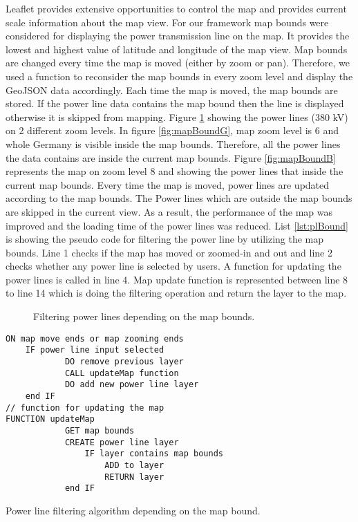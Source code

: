 Leaflet provides extensive opportunities to control the map and provides current scale information about the map view. For our framework map bounds were considered for displaying the power transmission line on the map. It provides the lowest and highest value of latitude and longitude of the map view. Map bounds are changed every time the map is moved (either by zoom or pan).  Therefore, we used a function to reconsider the map bounds in every zoom level and display the GeoJSON data accordingly. Each time the map is moved, the map bounds are stored. If the power line data contains the map bound then the line is displayed otherwise it is skipped from mapping. Figure \ref{fig:mpbound} showing the power lines (380 kV) on 2 different zoom levels. In figure \ref{fig:mapBoundG}, map zoom level is 6 and whole Germany is visible inside the map bounds. Therefore, all the power lines the data contains are inside the current map bounds. Figure \ref{fig:mapBoundB} represents the map on zoom level 8 and showing the power lines that inside the current map bounds. Every time the map is moved, power lines are updated according to the map bounds. The Power lines which are outside the map bounds are skipped in the current view. As a result, the performance of the map was improved and the loading time of the power lines was reduced. List \ref{lst:plBound} is showing the pseudo code for filtering the power line by utilizing the map bounds. Line 1 checks if the map has moved or zoomed-in and out and line 2 checks whether any power line is selected by users. A function for updating the power lines is called in line 4. Map update function is represented between line 8 to line 14 which is doing the filtering operation and return the layer to the map. 

\begin{figure}
  \begin{center}
\hfill
{}
\hfill
\caption{Filtering power lines depending on the map bounds.}
\label{fig:mpbound}
\end{center}
\end{figure}

\begin{Listing}
\begin{lstlisting}
ON map move ends or map zooming ends
	IF power line input selected
			DO remove previous layer
			CALL updateMap function
			DO add new power line layer
	end IF
// function for updating the map
FUNCTION updateMap
			GET map bounds
			CREATE power line layer
				IF layer contains map bounds
					ADD to layer
					RETURN layer
			end IF
\end{lstlisting}
\caption{Power line filtering algorithm depending on the map bound.}
\label{lst:plBound}
\end{Listing}

